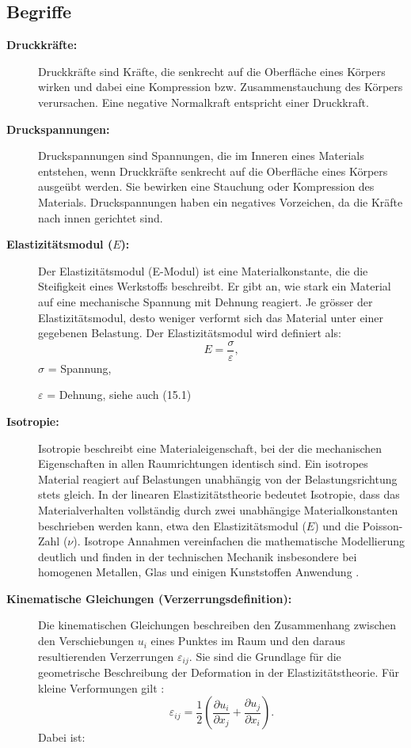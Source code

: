 \subsection{Begriffe}
\begin{description}
\item[\textbf{Druckkräfte:}] Druckkräfte sind Kräfte, die senkrecht auf die Oberfläche eines Körpers wirken und dabei eine Kompression bzw. Zusammenstauchung des Körpers verursachen. 
Eine negative Normalkraft entspricht einer Druckkraft.
	
\item[\textbf{Druckspannungen:}] Druckspannungen sind Spannungen, die im Inneren eines Materials entstehen, wenn Druckkräfte senkrecht auf die Oberfläche eines Körpers ausgeübt werden. 
Sie bewirken eine Stauchung oder Kompression des Materials.
Druckspannungen haben ein negatives Vorzeichen, da die Kräfte nach innen gerichtet sind.
	
\item[\textbf{Elastizitätsmodul ($E$):}] Der Elastizitätsmodul (E-Modul) ist eine Materialkonstante, die die Steifigkeit eines Werkstoffs beschreibt. 
Er gibt an, wie stark ein Material auf eine mechanische Spannung mit Dehnung reagiert. 
Je grösser der Elastizitätsmodul, desto weniger verformt sich das Material unter einer gegebenen Belastung.
Der Elastizitätsmodul wird definiert als:
	\begin{equation}
		E=
		\frac{\sigma}{\varepsilon},
	\end{equation}
	$\sigma$ = Spannung,
	
	$\varepsilon$ = Dehnung, siehe auch (15.1)
	
\item[\textbf{Isotropie:}] Isotropie beschreibt eine Materialeigenschaft, bei der die mechanischen Eigenschaften in allen Raumrichtungen identisch sind. 
Ein isotropes Material reagiert auf Belastungen unabhängig von der Belastungsrichtung stets gleich.
In der linearen Elastizitätstheorie bedeutet Isotropie, dass das Materialverhalten vollständig durch zwei unabhängige Materialkonstanten beschrieben werden kann, etwa den Elastizitätsmodul ($E$) und die Poisson-Zahl ($\nu$).  
Isotrope Annahmen vereinfachen die mathematische Modellierung deutlich und finden in der technischen Mechanik insbesondere bei homogenen Metallen, Glas und einigen Kunststoffen Anwendung \cite{elastomechanik:Isotropie}.
	
\item[\textbf{Kinematische Gleichungen (Verzerrungsdefinition):}] Die kinematischen Gleichungen beschreiben den Zusammenhang zwischen den Verschiebungen $u_i$ eines Punktes im Raum und den daraus resultierenden Verzerrungen $\varepsilon_{ij}$. 
Sie sind die Grundlage für die geometrische Beschreibung der Deformation in der Elastizitätstheorie. 
Für kleine Verformungen gilt \cite{elastomechanik:Technische_Mechanik_2:Elastostatik}:
	\begin{equation}
		\varepsilon_{ij} = 
		\frac{1}{2} \left( \frac{\partial u_i}{\partial x_j} + \frac{\partial u_j}{\partial x_i} \right).
	\end{equation}
Dabei ist:
	

\end{description}
